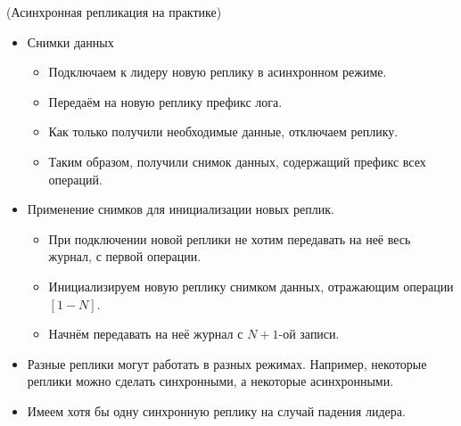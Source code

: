 \begin{example}(Асинхронная репликация на практике)
    \begin{itemize}
        \item Снимки данных
        \begin{itemize}
            \item Подключаем к лидеру новую реплику в асинхронном режиме.
            \item Передаём на новую реплику префикс лога.
            \item Как только получили необходимые данные, отключаем реплику.
            \item Таким образом, получили снимок данных, содержащий префикс всех операций.
        \end{itemize}

        \item Применение снимков для инициализации новых реплик.
        \begin{itemize}
            \item При подключении новой реплики не хотим передавать на неё весь журнал, с первой операции.
            \item Инициализируем новую реплику снимком данных, отражающим операции $[1-N]$.
            \item Начнём передавать на неё журнал с $N+1$-ой записи.
        \end{itemize}

        \item Разные реплики могут работать в разных режимах. Например, некоторые реплики можно сделать синхронными, а некоторые асинхронными.
        \item Имеем хотя бы одну синхронную реплику на случай падения лидера.

    \end{itemize}

\end{example}
